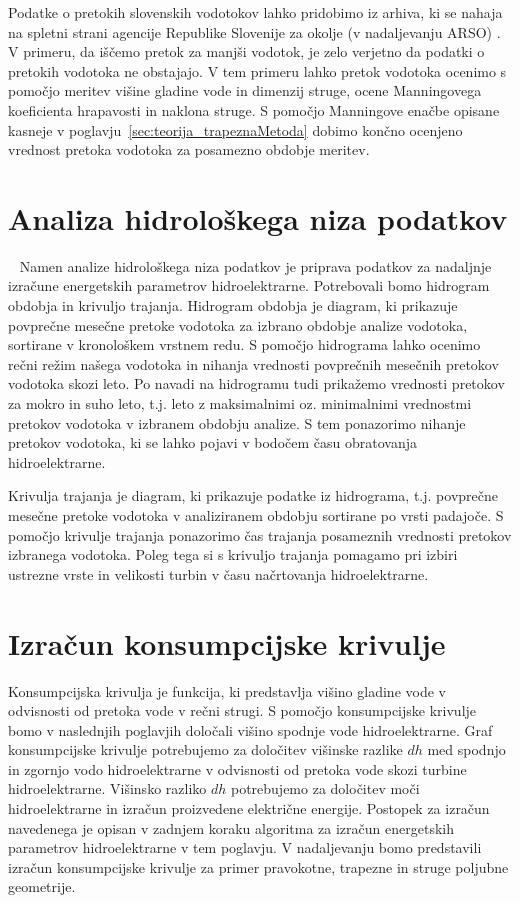  
 
  Podatke o pretokih slovenskih vodotokov lahko pridobimo iz arhiva, ki se nahaja na spletni strani agencije Republike Slovenije za okolje (v nadaljevanju ARSO) \cite{Arso}. V primeru, da iščemo pretok za manjši vodotok, je zelo verjetno da podatki o pretokih vodotoka ne obstajajo. V tem primeru lahko pretok vodotoka ocenimo s pomočjo meritev višine gladine vode in dimenzij struge, ocene Manningovega koeficienta hrapavosti in naklona struge. S pomočjo Manningove enačbe opisane kasneje v poglavju~\ref{sec:teorija_trapeznaMetoda} dobimo končno ocenjeno vrednost pretoka vodotoka za posamezno obdobje meritev.




\section{Analiza hidrološkega niza podatkov}~\label{sec:teorija_hidrogramObdobja}
Namen analize hidrološkega niza podatkov je priprava podatkov za nadaljnje izračune energetskih parametrov hidroelektrarne. Potrebovali bomo hidrogram obdobja in krivuljo trajanja. Hidrogram obdobja je diagram, ki prikazuje povprečne mesečne pretoke vodotoka za izbrano obdobje analize vodotoka, sortirane v kronološkem vrstnem redu. S pomočjo hidrograma lahko ocenimo rečni režim našega vodotoka in nihanja vrednosti povprečnih mesečnih pretokov vodotoka skozi leto. Po navadi na hidrogramu tudi prikažemo vrednosti pretokov za mokro in suho leto, t.j. leto z maksimalnimi oz. minimalnimi vrednostmi pretokov vodotoka v izbranem obdobju analize. S tem ponazorimo nihanje pretokov vodotoka, ki se lahko pojavi v bodočem času obratovanja hidroelektrarne.


Krivulja trajanja je diagram, ki prikazuje podatke iz hidrograma, t.j. povprečne mesečne pretoke vodotoka v analiziranem obdobju sortirane po vrsti padajoče. S pomočjo krivulje trajanja ponazorimo čas trajanja posameznih vrednosti pretokov izbranega vodotoka. Poleg tega si s krivuljo trajanja pomagamo pri izbiri ustrezne vrste in velikosti turbin v času načrtovanja hidroelektrarne.


\section{Izračun konsumpcijske krivulje}
Konsumpcijska krivulja je funkcija, ki predstavlja višino gladine vode v odvisnosti od pretoka vode v rečni strugi.  S pomočjo konsumpcijske krivulje bomo v naslednjih poglavjih določali višino spodnje vode hidroelektrarne. Graf konsumpcijske krivulje potrebujemo za določitev višinske razlike $dh$ med spodnjo in zgornjo vodo hidroelektrarne v odvisnosti od pretoka vode skozi turbine hidroelektrarne. Višinsko razliko $dh$ potrebujemo za določitev moči hidroelektrarne in izračun proizvedene električne energije. Postopek za izračun navedenega je opisan v zadnjem koraku algoritma za izračun energetskih parametrov hidroelektrarne v tem poglavju. V nadaljevanju bomo predstavili izračun konsumpcijske krivulje za primer pravokotne, trapezne in struge poljubne geometrije.



